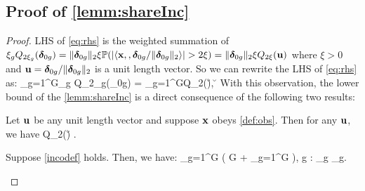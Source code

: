 	
		






%

\subsection{Proof of \cref{lemm:shareInc}}
\begin{proof}
	LHS of \cref{eq:rhs} is the weighted summation of $\xi_g Q_{2\xi_g}(\boldsymbol{\delta}_{0g}) = \|\boldsymbol{\delta}_{0g}\|_{2}\xi \mathbb{P}(|\langle \mathbf{x}, , \boldsymbol{\delta}_{0g}/\|\boldsymbol{\delta}_{0g}\|_{2} \rangle| > 2\xi) = \|\boldsymbol{\delta}_{0g}\|_{2}\xi Q_{2\xi}(\mathbf{u})$ where $\xi > 0$ and $\mathbf{u} = \boldsymbol{\delta}_{0g}/\|\boldsymbol{\delta}_{0g}\|_{2}$ is a unit length vector. 
	So we can rewrite the LHS of \cref{eq:rhs} as:
	\be 
	\nr 
	\sum_{g=1}^G\xi_g Q_{2\xi_g}(\ddelta_{0g}) = \sum_{g=1}^G\xi Q_{2\xi}(\u), \quad \u \in \sphere
	\ee 
	With this observation, the lower bound of the \cref{lemm:shareInc} is a direct consequence of the following two results: 
	\begin{lemma}\label{paley} Let $\mathbf{u}$ be any unit length vector and suppose $\mathbf{x}$ obeys \cref{def:obs}. Then for any $\mathbf{u}$, we have
		\be 
		Q_{2\xi}(\u) \geq {}.
		\ee 	
	\end{lemma}
	\begin{lemma} \label{incolem main} Suppose \cref{incodef} holds. Then, we have: 
		\be 
		\sum_{g=1}^G  \geq{} \left( G + \sum_{g=1}^G   \right), \quad \forall g \in [G_+]: \ddelta_g \in \cC_g.
		\ee 
	\end{lemma}	
\end{proof}



